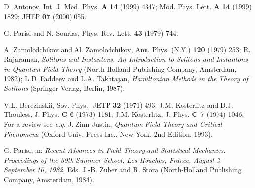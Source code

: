 \documentclass[a4paper,12pt]{article}
\begin{document}
\begin{thebibliography}{99}
D. Antonov, Int. J. Mod. Phys. {\bf A 14} (1999) 4347; Mod. Phys. Lett. {\bf A 14} (1999) 1829; 
JHEP {\bf 07} (2000) 055.

G. Parisi and N. Sourlas, Phys. Rev. Lett. {\bf 43} (1979) 744.

A. Zamolodchikov and Al. Zamolodchikov, Ann. Phys. (N.Y.) {\bf 120} (1979) 253; 
R. Rajaraman, {\it Solitons and Instantons. An Introduction to Solitons and Instantons in Quantum Field Theory} 
(North-Holland Publishing Company, Amsterdam, 1982); 
L.D. Faddeev and L.A. Takhtajan, {\it Hamiltonian Methods in the Theory of Solitons} (Springer Verlag, Berlin, 1987).

V.L. Berezinskii, Sov. Phys.- JETP {\bf 32} (1971) 493; 
J.M. Kosterlitz and D.J. Thouless, J. Phys. {\bf C 6} (1973) 1181; J.M. Kosterlitz, J. Phys. {\bf C 7} (1974) 1046; 
For a review see {\it e.g.} J. Zinn-Justin, {\it Quantum Field Theory and Critical Phenomena} (Oxford Univ. Press Inc., 
New York, 2nd Edition, 1993).

G. Parisi, in: {\it Recent Advances in Field Theory and Statistical Mechanics. Proceedings of the 39th Summer School, Les Houches, France, August 2- 
September 10, 1982}, Eds. J.-B. Zuber and R. Stora (North-Holland Publishing Company, Amsterdam, 1984).



\end{thebibliography}
\end{document}
